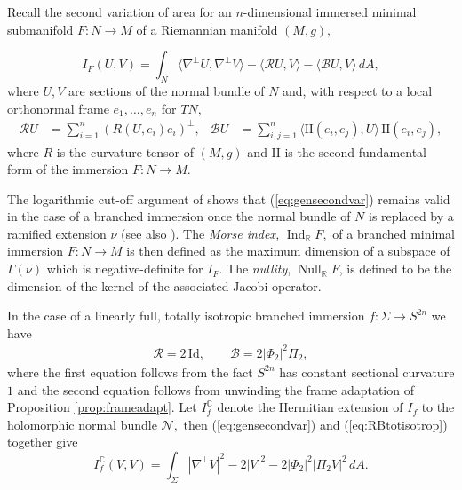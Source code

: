 \documentclass[11pt]{article}
\theoremstyle{definition}
\newcommand{\R}{\mathbb{R}}
\newcommand{\C}{\mathbb{C}}
\numberwithin{equation}{section}
\begin{document}
\indent \indent Recall the second variation of area \cite{Simons68} for an $n$-dimensional immersed minimal submanifold $F: N \to M$ of a Riemannian manifold $(M,g),$

\begin{equation}\label{eq:gensecondvar}
	I_F(U,V) = \int_N  \langle \nabla^{\perp} U, \nabla^{\perp} V \rangle - \langle \mathcal{R} U, V \rangle - \langle \mathcal{B} U, V \rangle \, dA,
\end{equation}
where $U, V$ are sections of the normal bundle of $N$ and, with respect to a local orthonormal frame $e_1, \ldots, e_n$ for $TN,$
\begin{equation*}
	\begin{aligned}
		\mathcal{R} U & = \sum_{i=1}^n \left( R (U, e_i) e_i \right)^{\perp},                             &
		\mathcal{B}U  & = \sum_{i,j=1}^n \langle \mathrm{II}(e_i,e_j), U \rangle \, \mathrm{II}(e_i,e_j), 
	\end{aligned}
\end{equation*}
where $R$ is the curvature tensor of $(M,g)$ and $\mathrm{II}$ is the second fundamental form of the immersion $F: N \to M.$

The logarithmic cut-off argument of \cite[\S3]{Micallef86} shows that (\ref{eq:gensecondvar}) remains valid in the case of a branched immersion once the normal bundle of $N$ is replaced by a ramified extension $\nu$ (see also \cite[Theorem 2.1 and Equation (2.27)]{EjiriMicallef08}). The \emph{Morse index,} $\operatorname{Ind}_\R F,$ of a branched minimal immersion $F: N \to M$ is then defined as the maximum dimension of a subspace of $\Gamma(\nu)$ which is negative-definite for $I_F.$ The \emph{nullity}, $\operatorname{Null}_\R F$, is defined to be the dimension of the kernel of the associated Jacobi operator.

In the case of a linearly full, totally isotropic branched immersion $f: \Sigma \to S^{2n}$ we have
\begin{equation}\label{eq:RBtotisotrop}
	\begin{aligned}
		\mathcal{R} = 2 \, \mathrm{Id}, \qquad \mathcal{B} = 2 \lvert \Phi_2 \rvert^2 \Pi_2, 
	\end{aligned}
\end{equation}
where the first equation follows from the fact $S^{2n}$ has constant sectional curvature $1$ and the second equation follows from unwinding the frame adaptation of Proposition \ref{prop:frameadapt}. Let $I_f^\C$ denote the Hermitian extension of $I_f$ to the holomorphic normal bundle $\mathcal{N},$ then (\ref{eq:gensecondvar}) and (\ref{eq:RBtotisotrop}) together give
\begin{equation}\label{eq:secondvartotisotropic}
	I_f^\C (V,V) = \int_\Sigma \left\lvert \nabla^\perp V \right\rvert^2 - 2 \lvert V \rvert^2 - 2  \lvert \Phi_2 \rvert^2 \lvert \Pi_2 V \rvert^2 \, dA.
\end{equation}
\end{document}

